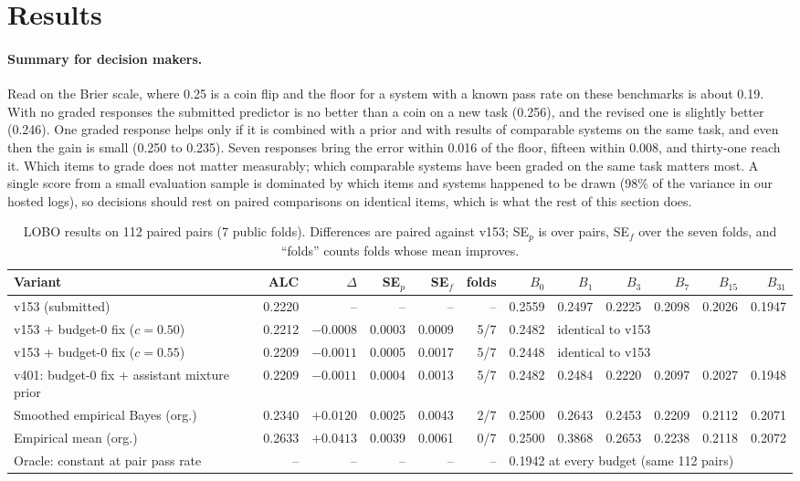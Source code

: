 \documentclass{article}
\begin{document}
\section{Results}
\label{sec:results}

\paragraph{Summary for decision makers.} Read on the Brier scale, where 0.25 is a coin flip and the floor for a system with a known pass rate on these benchmarks is about 0.19. With no graded responses the submitted predictor is no better than a coin on a new task (0.256), and the revised one is slightly better (0.246). One graded response helps only if it is combined with a prior and with results of comparable systems on the same task, and even then the gain is small (0.250 to 0.235). Seven responses bring the error within 0.016 of the floor, fifteen within 0.008, and thirty-one reach it. Which items to grade does not matter measurably; which comparable systems have been graded on the same task matters most. A single score from a small evaluation sample is dominated by which items and systems happened to be drawn (98\% of the variance in our hosted logs), so decisions should rest on paired comparisons on identical items, which is what the rest of this section does.

\begin{table}[t]
\caption{LOBO results on 112 paired pairs (7 public folds). Differences are paired against v153; SE$_p$ is over pairs, SE$_f$ over the seven folds, and ``folds'' counts folds whose mean improves.}
\label{tab:lobo}
\centering\small
\begin{tabular}{lrrrrrrrrrrr}
\toprule
Variant & ALC & $\Delta$ & SE$_p$ & SE$_f$ & folds & $B_0$ & $B_1$ & $B_3$ & $B_7$ & $B_{15}$ & $B_{31}$ \\
\midrule
v153 (submitted) & 0.2220 & -- & -- & -- & -- & 0.2559 & 0.2497 & 0.2225 & 0.2098 & 0.2026 & 0.1947 \\
v153 + budget-0 fix ($c{=}0.50$) & 0.2212 & $-0.0008$ & 0.0003 & 0.0009 & 5/7 & 0.2482 & \multicolumn{5}{l}{identical to v153} \\
v153 + budget-0 fix ($c{=}0.55$) & 0.2209 & $-0.0011$ & 0.0005 & 0.0017 & 5/7 & 0.2448 & \multicolumn{5}{l}{identical to v153} \\
v401: budget-0 fix + assistant mixture prior & 0.2209 & $-0.0011$ & 0.0004 & 0.0013 & 5/7 & 0.2482 & 0.2484 & 0.2220 & 0.2097 & 0.2027 & 0.1948 \\
Smoothed empirical Bayes (org.) & 0.2340 & $+0.0120$ & 0.0025 & 0.0043 & 2/7 & 0.2500 & 0.2643 & 0.2453 & 0.2209 & 0.2112 & 0.2071 \\
Empirical mean (org.) & 0.2633 & $+0.0413$ & 0.0039 & 0.0061 & 0/7 & 0.2500 & 0.3868 & 0.2653 & 0.2238 & 0.2118 & 0.2072 \\
\midrule
Oracle: constant at pair pass rate & -- & -- & -- & -- & -- & \multicolumn{6}{l}{0.1942 at every budget (same 112 pairs)} \\
\bottomrule
\end{tabular}
\end{table}
\end{document}
